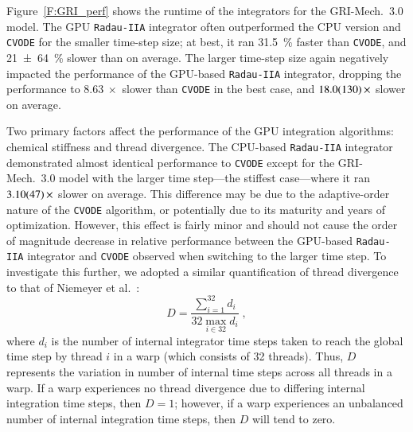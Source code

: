 \documentclass[preprint]{elsarticle}
\begin{document}
Figure~\ref{F:GRI_perf} shows the runtime of the integrators for the GRI-Mech.~3.0 model.
The GPU \texttt{Radau-IIA} integrator often outperformed the CPU version and \texttt{CVODE} for the smaller time-step size; at best, it ran \SI{31.5}{\percent} faster than \texttt{CVODE}, and \SI{21\pm64}{\percent} slower than on average.
The larger time-step size again negatively impacted the performance of the GPU-based \texttt{Radau-IIA} integrator, dropping the performance to $\SI{8.63}{\times}$ slower than \texttt{CVODE} in the best case, and $\SI{18.0\pm13.0}{\times}$ slower on average.

Two primary factors affect the performance of the GPU integration algorithms: chemical stiffness and thread divergence.
The CPU-based \texttt{Radau-IIA} integrator demonstrated almost identical performance to \texttt{CVODE} except for the GRI-Mech.~3.0 model with the larger time step---the stiffest case---where it ran $\SI{3.1\pm0.47}{\times}$ slower on average.
This difference may be due to the adaptive-order nature of the \texttt{CVODE} algorithm, or potentially due to its maturity and years of optimization.
However, this effect is fairly minor and should not cause the order of magnitude decrease in relative performance between the GPU-based \texttt{Radau-IIA} integrator and \texttt{CVODE} observed when switching to the larger time step.
To investigate this further, we adopted a similar quantification of thread divergence to that of Niemeyer et al.~\cite{Niemeyer:2014aa}:
\begin{equation}
	D = \frac{\sum_{i=1}^{32}{d_i}}{32 \max_{i \in 32} d_i} \;,
	\label{eqn:divergence}
\end{equation}
where $d_i$ is the number of internal integrator time steps taken to reach the global time step by thread $i$ in a warp (which consists of 32 threads).
Thus, $D$ represents the variation in number of internal time steps across all threads in a warp.
If a warp experiences no thread divergence due to differing internal integration time steps, then $D = 1$; however, if a warp experiences an unbalanced number of internal integration time steps, then $D$ will tend to zero.
\end{document}
